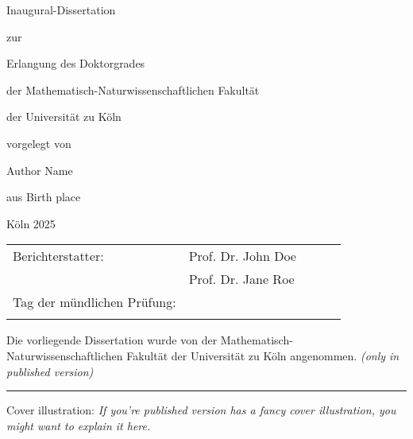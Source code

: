 \begin{titlepage}
\renewcommand{\footnotesize}{\small}
\renewcommand{\footnoterule}{\relax}

\thispagestyle{empty}
\renewcommand{\baselinestretch}{1} 
\begin{center}
	{\vspace*{1mm} \Huge {\color{maincolor2} } \par}
	{ \Large \vspace*{20mm} {\LARGE \mainsemibold Inaugural-Dissertation} \par \vspace*{4mm} zur \par \vspace*{4mm} Erlangung des Doktorgrades \par \vspace*{4mm} der Mathematisch-Naturwissenschaftlichen Fakultät \par \vspace*{4mm} der Universität zu Köln \par \vspace*{4mm} vorgelegt von \par  \vspace*{15mm}}
	{{\LARGE \mainsemibold Author Name} \par \vspace*{10mm}}
	{\large \vspace*{1ex} aus Birth place \par \vspace*{1ex}}
	{\large K\"oln 2025}
\end{center}
\end{titlepage}


\thispagestyle{empty}
\begin{center}
\setlength{\tabcolsep}{2em} %
\begin{tabular}{lllll}
	Berichterstatter:           & Prof. Dr. John Doe &  &  &  \\[1em]
	& Prof. Dr. Jane Roe  &  &  &  \\[2em]
	Tag der mündlichen Prüfung: &             &  &  &  \\
	&                        &  &  & 
\end{tabular}
\end{center}

\vfill
Die vorliegende Dissertation wurde von der Mathematisch-Naturwissenschaftlichen Fakult\"at der Universit\"at zu K\"oln angenommen. \emph{\color{lightgray}(only in published version)} \\
\hrule
\vspace{.3cm}
{\noindent \scriptsize Cover illustration: \emph{\color{lightgray} If you're published version has a fancy cover illustration, you might want to explain it here.}}